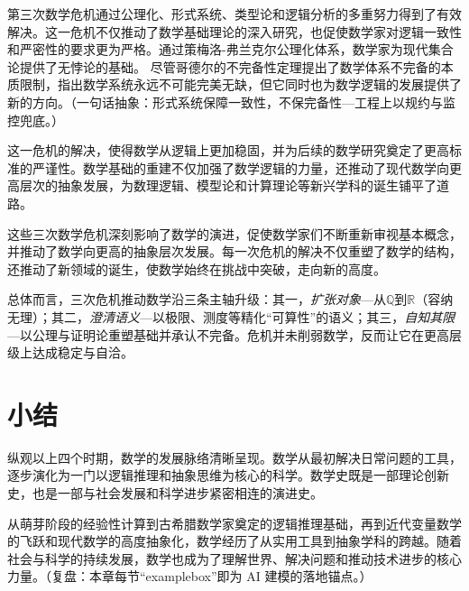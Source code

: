第三次数学危机通过公理化、形式系统、类型论和逻辑分析的多重努力得到了有效解决。这一危机不仅推动了数学基础理论的深入研究，也促使数学家对逻辑一致性和严密性的要求更为严格。通过策梅洛-弗兰克尔公理化体系，数学家为现代集合论提供了无悖论的基础。
尽管哥德尔的不完备性定理提出了数学体系不完备的本质限制，指出数学系统永远不可能完美无缺，但它同时也为数学逻辑的发展提供了新的方向。{（一句话抽象：形式系统保障一致性，不保完备性—工程上以规约与监控兜底。）}

这一危机的解决，使得数学从逻辑上更加稳固，并为后续的数学研究奠定了更高标准的严谨性。数学基础的重建不仅加强了数学逻辑的力量，还推动了现代数学向更高层次的抽象发展，为数理逻辑、模型论和计算理论等新兴学科的诞生铺平了道路。

这些三次数学危机深刻影响了数学的演进，促使数学家们不断重新审视基本概念，并推动了数学向更高的抽象层次发展。每一次危机的解决不仅重塑了数学的结构，还推动了新领域的诞生，使数学始终在挑战中突破，走向新的高度。

总体而言，三次危机推动数学沿三条主轴升级：其一，{\itshape 扩张对象}---从$\mathbb{Q}$到$\mathbb{R}$（容纳无理）；其二，{\itshape 澄清语义}---以极限、测度等精化“可算性”的语义；其三，{\itshape 自知其限}---以公理与证明论重塑基础并承认不完备。危机并未削弱数学，反而让它在更高层级上达成稳定与自洽。

\section{小结}
纵观以上四个时期，数学的发展脉络清晰呈现。数学从最初解决日常问题的工具，逐步演化为一门以逻辑推理和抽象思维为核心的科学。数学史既是一部理论创新史，也是一部与社会发展和科学进步紧密相连的演进史。

从萌芽阶段的经验性计算到古希腊数学家奠定的逻辑推理基础，再到近代变量数学的飞跃和现代数学的高度抽象化，数学经历了从实用工具到抽象学科的跨越。随着社会与科学的持续发展，数学也成为了理解世界、解决问题和推动技术进步的核心力量。{（复盘：本章每节“examplebox”即为 AI 建模的落地锚点。）}

